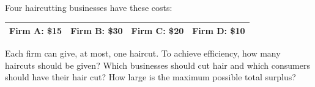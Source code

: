 \documentclass{article}
\begin{document}
\begin{enumerate}
	Four haircutting businesses have these costs:
	
	\begin{center}
	\begin{tabular}{| c | c | c | c |}
	\hline
	Firm A: \$15 & Firm B: \$30 & Firm C: \$20 & Firm D: \$10 \\
	\hline
	\end{tabular}
	\end{center}
	
	Each firm can give, at most, one haircut. To achieve efficiency, how many haircuts should be given? Which businesses should cut hair and which consumers should have their hair cut? How large is the maximum possible total surplus?

\end{enumerate}
\end{document}
